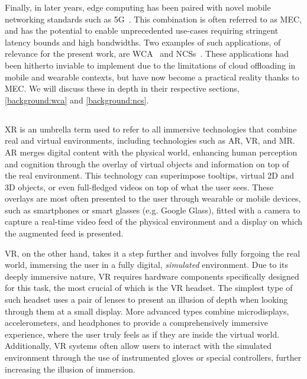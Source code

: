 Finally, in later years, edge computing has been paired with novel mobile networking standards such as 5G~\cite{hassan2019edge,pham2020survey,wan2020efficient}.
This combination is often referred to as \gls{MEC}, and has the potential to enable unprecedented use-cases requiring stringent latency bounds and high bandwidths.
Two examples of such applications, of relevance for the present work, are \acl{WCA}~\cite{ha2014towards,chen2018application,wang2020scaling,chen2017empirical,chen2018application} and \aclp{NCS}~\cite{sasaki2016vehicle,wang2018bandwidth,wan2020efficient}.
These applications had been hitherto inviable to implement due to the limitations of cloud offloading in mobile and wearable contexts, but have now become a practical reality thanks to \gls{MEC}.
We will discuss these in depth in their respective sections, \cref{background:wca} and \cref{background:ncs}.

\subsection{}\label{background:xr}

\gls{XR} is an umbrella term used to refer to all immersive technologies that combine real and virtual environments, including technologies such as \gls{AR}, \gls{VR}, and \gls{MR}.
\gls{AR} merges digital content with the physical world, enhancing human perception and cognition through the overlay of virtual objects and information on top of the real environment.
This technology can superimpose tooltips, virtual \gls{2D} and \gls{3D} objects, or even full-fledged videos on top of what the user sees.
These overlays are most often presented to the user through wearable or mobile devices, such as smartphones or smart glasses (e.g. Google Glass), fitted with a camera to capture a real-time video feed of the physical environment and a display on which the augmented feed is presented.

\gls{VR}, on the other hand, takes it a step further and involves fully forgoing the real world, immersing the user in a fully digital, \emph{simulated} environment.
Due to its deeply immersive nature, \gls{VR} requires hardware components specifically designed for this task, the most crucial of which is the \gls{VR} headset.
The simplest type of such headset uses a pair of lenses to present an illusion of depth when looking through them at a small display.
More advanced types combine microdisplays, accelerometers, and headphones to provide a comprehensively immersive experience, where the user truly feels as if they are inside the virtual world.
Additionally, \gls{VR} systems often allow users to interact with the simulated environment through the use of instrumented gloves or special controllers, further increasing the illusion of immersion.

